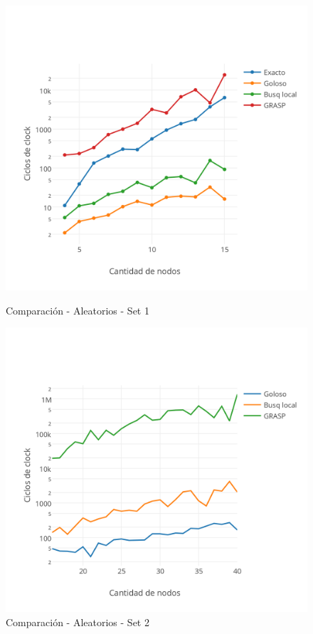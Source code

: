 \begin{figure}[!htb]
\begin{center}
  \includegraphics[scale=0.6]{imagenes/final-aleatorios-comp.png}
\end{center}
  \caption{Comparación - Aleatorios - Set 1}\label{fig:5D}
\endminipage\hfill
{}
\begin{center}
  \includegraphics[scale=0.6]{imagenes/final-aleatorios.png}
\end{center}
  \caption{Comparación - Aleatorios - Set 2}\label{fig:5E}
\endminipage
\end{figure}


